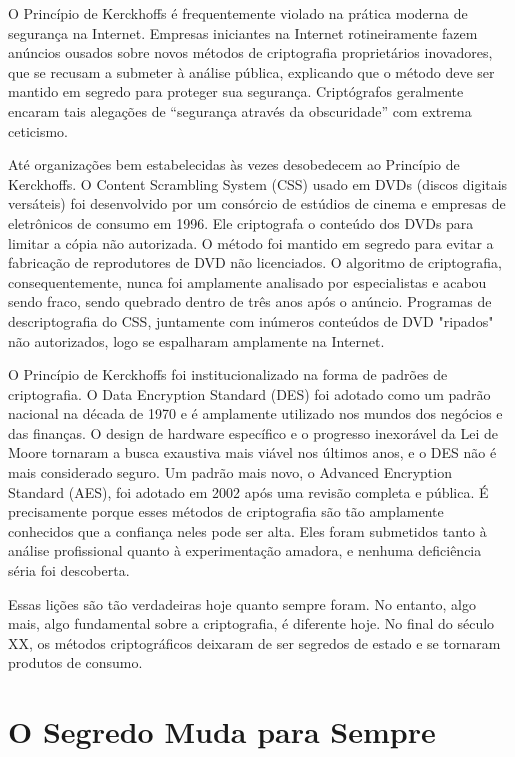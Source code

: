 \documentclass{book}
\begin{document}
O Princípio de Kerckhoffs é frequentemente violado na prática moderna de segurança na Internet. Empresas iniciantes na Internet rotineiramente fazem anúncios ousados sobre novos métodos de criptografia proprietários inovadores, que se recusam a submeter à análise pública, explicando que o método deve ser mantido em segredo para proteger sua segurança. Criptógrafos geralmente encaram tais alegações de ``segurança através da obscuridade'' com extrema ceticismo.

Até organizações bem estabelecidas às vezes desobedecem ao Princípio de Kerckhoffs. O Content Scrambling System (CSS) usado em DVDs (discos digitais versáteis) foi desenvolvido por um consórcio de estúdios de cinema e empresas de eletrônicos de consumo em 1996. Ele criptografa o conteúdo dos DVDs para limitar a cópia não autorizada. O método foi mantido em segredo para evitar a fabricação de reprodutores de DVD não licenciados. O algoritmo de criptografia, consequentemente, nunca foi amplamente analisado por especialistas e acabou sendo fraco, sendo quebrado dentro de três anos após o anúncio. Programas de descriptografia do CSS, juntamente com inúmeros conteúdos de DVD "ripados" não autorizados, logo se espalharam amplamente na Internet.

O Princípio de Kerckhoffs foi institucionalizado na forma de padrões de criptografia. O Data Encryption Standard (DES) foi adotado como um padrão nacional na década de 1970 e é amplamente utilizado nos mundos dos negócios e das finanças. O design de hardware específico e o progresso inexorável da Lei de Moore tornaram a busca exaustiva mais viável nos últimos anos, e o DES não é mais considerado seguro. Um padrão mais novo, o Advanced Encryption Standard (AES), foi adotado em 2002 após uma revisão completa e pública. É precisamente porque esses métodos de criptografia são tão amplamente conhecidos que a confiança neles pode ser alta. Eles foram submetidos tanto à análise profissional quanto à experimentação amadora, e nenhuma deficiência séria foi descoberta.

Essas lições são tão verdadeiras hoje quanto sempre foram. No entanto, algo mais, algo fundamental sobre a criptografia, é diferente hoje. No final do século XX, os métodos criptográficos deixaram de ser segredos de estado e se tornaram produtos de consumo.


\section{O Segredo Muda para Sempre}
\label{segredos:muda}
\end{document}
